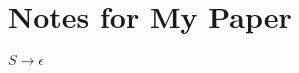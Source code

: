 \documentclass[12pt]{article}
\begin{document}
\section*{Notes for My Paper}

$ S \rightarrow \epsilon $
\end{document}
